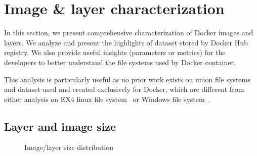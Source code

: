 \section{Image \& layer characterization}
\label{sec:redundant_layers}

In this section, we present comprehensive characterization of Docker images and
layers.  We analyze and present the highlights of dataset stored by Docker Hub
registry.  We also provide useful insights (parameters or metrics)
for the developers to better
understand the file systems used by Docker container. 

This analysis is particularly useful as no prior work exists on union file
systems~\cite{xxx} and dataset used and created exclusively for Docker,
which are different from either analysis on EX4 linux file system~\cite{xxx} or
Windows file system~\cite{xxx}. 


\subsection{Layer and image size}
\begin{figure}[!t]
	\centering

	\caption{Image/layer size distribution}
	\label{fig:image-layer-size}
\end{figure}

